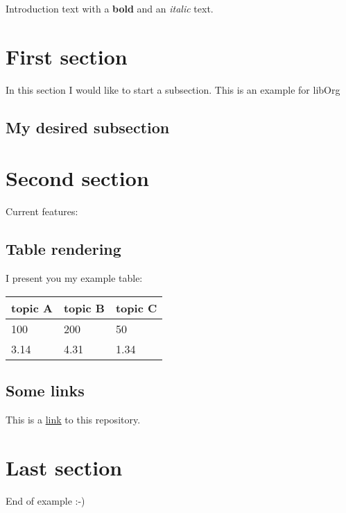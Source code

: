 \documentclass{article}
\begin{document}
Introduction text with a \textbf{bold} and an \textit{italic} text.

\section{First section}
In this section I would like to start a subsection.  This is an example for libOrg

\subsection{My desired subsection}
\section{Second section}
Current features:

\subsection{Table rendering}
I present you my example table:

\begin{table}[h!]
\begin{tabular}{l|l|l}
topic A & topic B & topic C \\
\hline
100 & 200 & 50 \\
3.14 & 4.31 & 1.34 \\
\end{tabular}
\end{table}
\subsection{Some links}
This is a \href{https://github.com/ppaulweber/liborg}{link} to this repository.

\section{Last section}
End of example :-)

\end{document}
